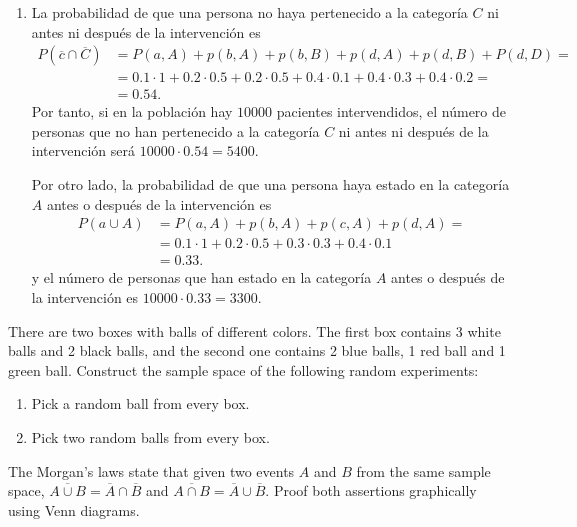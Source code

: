 {\begin{enumerate}
Luego es igualmente probable que proceda de las categorías $c$ o $d$.

\item La probabilidad de que una persona no haya pertenecido a la categoría $C$ ni antes ni después de la intervención es 
\begin{align*}
P(\overline c\cap \overline C) &= P(a,A)+p(b,A)+p(b,B)+p(d,A)+p(d,B)+P(d,D) =\\
& = 0.1 \cdot 1 + 0.2 \cdot 0.5 + 0.2 \cdot 0.5 + 0.4 \cdot 0.1 + 0.4 \cdot 0.3 + 0.4 \cdot 0.2 = \\
& = 0.54.
\end{align*}
Por tanto, si en la población hay $10000$ pacientes intervendidos, el número de personas que no han pertenecido a la categoría $C$
ni antes ni después de la intervención será $10000\cdot 0.54 = 5400$.

Por otro lado, la probabilidad de que una persona haya estado en la categoría $A$ antes o después de la intervención es
\begin{align*}
P(a\cup A) &= P(a,A) + p(b,A) + p(c,A) + p(d,A) =\\
&=   0.1 \cdot 1 +  0.2 \cdot 0.5 +  0.3 \cdot 0.3 +  0.4 \cdot 0.1 \\
&=  0.33.
\end{align*}
y el número de personas que han estado en la categoría $A$ antes o después de la intervención es $10000\cdot 0.33 = 3300$.
\end{enumerate}
}


{There are two boxes with balls of different colors. 
The first box contains 3 white balls and 2 black balls, and the second one contains 2 blue balls, 1 red ball and 1 green ball. 
Construct the sample space of the following random experiments:
\begin{enumerate}
\item Pick a random ball from every box. 
\item Pick two random balls from every box.
\end{enumerate}
}
{}
{}


{The Morgan's laws state that given two events $A$ and $B$ from the same sample space, $\overline{A\cup B}=\overline A \cap \overline B$ and $\overline{A\cap B}=\overline A \cup \overline B$.
Proof both assertions graphically using Venn diagrams.
}
{}
{}



